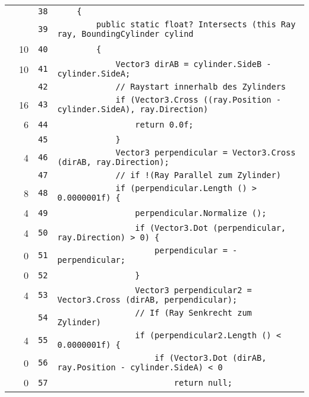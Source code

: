 \documentclass[a4paper,10pt]{article}
\begin{document}
\begin{longtable}[l]{lrrl}
\cellcolor{gray} &  & \verb~38~ & \verb~    {~\\
\cellcolor{gray} &  & \verb~39~ & \verb~        public static float? Intersects (this Ray ray, BoundingCylinder cylind~\\
\cellcolor{green} & 10 & \verb~40~ & \verb~        {~\\
\cellcolor{green} & 10 & \verb~41~ & \verb~            Vector3 dirAB = cylinder.SideB - cylinder.SideA;~\\
\cellcolor{gray} &  & \verb~42~ & \verb~            // Raystart innerhalb des Zylinders~\\
\cellcolor{green} & 16 & \verb~43~ & \verb~            if (Vector3.Cross ((ray.Position - cylinder.SideA), ray.Direction)~\\
\cellcolor{green} & 6 & \verb~44~ & \verb~                return 0.0f;~\\
\cellcolor{gray} &  & \verb~45~ & \verb~            }~\\
\cellcolor{green} & 4 & \verb~46~ & \verb~            Vector3 perpendicular = Vector3.Cross (dirAB, ray.Direction);~\\
\cellcolor{gray} &  & \verb~47~ & \verb~            // if !(Ray Parallel zum Zylinder)~\\
\cellcolor{green} & 8 & \verb~48~ & \verb~            if (perpendicular.Length () > 0.0000001f) {~\\
\cellcolor{green} & 4 & \verb~49~ & \verb~                perpendicular.Normalize ();~\\
\cellcolor{green} & 4 & \verb~50~ & \verb~                if (Vector3.Dot (perpendicular, ray.Direction) > 0) {~\\
\cellcolor{red} & 0 & \verb~51~ & \verb~                    perpendicular = -perpendicular;~\\
\cellcolor{red} & 0 & \verb~52~ & \verb~                }~\\
\cellcolor{green} & 4 & \verb~53~ & \verb~                Vector3 perpendicular2 = Vector3.Cross (dirAB, perpendicular);~\\
\cellcolor{gray} &  & \verb~54~ & \verb~                // If (Ray Senkrecht zum Zylinder)~\\
\cellcolor{green} & 4 & \verb~55~ & \verb~                if (perpendicular2.Length () < 0.0000001f) {~\\
\cellcolor{red} & 0 & \verb~56~ & \verb~                    if (Vector3.Dot (dirAB, ray.Position - cylinder.SideA) < 0~\\
\cellcolor{red} & 0 & \verb~57~ & \verb~                        return null;~\\

\end{longtable}
\end{document}

